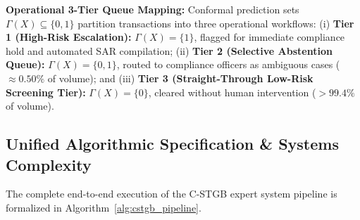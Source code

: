 \textbf{Operational 3-Tier Queue Mapping:} Conformal prediction sets $\Gamma(X) \subseteq \{0, 1\}$ partition transactions into three operational workflows: (i) \textbf{Tier 1 (High-Risk Escalation):} $\Gamma(X) = \{1\}$, flagged for immediate compliance hold and automated SAR compilation; (ii) \textbf{Tier 2 (Selective Abstention Queue):} $\Gamma(X) = \{0, 1\}$, routed to compliance officers as ambiguous cases ($\approx 0.50\%$ of volume); and (iii) \textbf{Tier 3 (Straight-Through Low-Risk Screening Tier):} $\Gamma(X) = \{0\}$, cleared without human intervention ($>99.4\%$ of volume).

\subsection{Unified Algorithmic Specification \& Systems Complexity}
\label{sec:algorithm_complexity}
The complete end-to-end execution of the C-STGB expert system pipeline is formalized in Algorithm~\ref{alg:cstgb_pipeline}.

